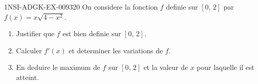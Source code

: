 \begin{exercice}{1NSI-ADGK-EX-009}{3}{20}
On considere la fonction $f$ definie sur $[0,\, 2]$ par $f(x) = x\sqrt{4 - x^2}$.
\begin{enumerate}
  \item Justifier que $f$ est bien definie sur $[0,\, 2]$.
  \item Calculer $f'(x)$ et determiner les variations de $f$.
  \item En deduire le maximum de $f$ sur $[0,\, 2]$ et la valeur de $x$ pour laquelle il est atteint.
\end{enumerate}

\end{exercice}
